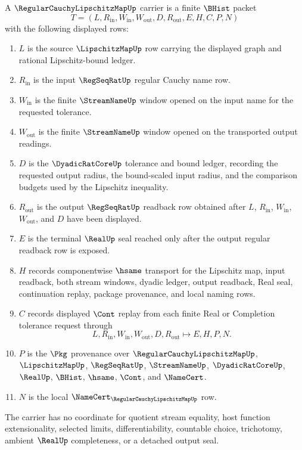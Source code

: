 \begin{definition}
\label{def:regular-cauchy-lipschitz-map-carrier}
A $\RegularCauchyLipschitzMapUp$ carrier is a finite $\BHist$ packet
$$
T=(L,R_{\mathrm{in}},W_{\mathrm{in}},W_{\mathrm{out}},D,R_{\mathrm{out}},E,H,C,P,N)
$$
with the following displayed rows:
\begin{enumerate}
\item $L$ is the source $\LipschitzMapUp$ row carrying the displayed graph and rational Lipschitz-bound ledger.
\item $R_{\mathrm{in}}$ is the input $\RegSeqRatUp$ regular Cauchy name row.
\item $W_{\mathrm{in}}$ is the finite $\StreamNameUp$ window opened on the input name for the requested tolerance.
\item $W_{\mathrm{out}}$ is the finite $\StreamNameUp$ window opened on the transported output readings.
\item $D$ is the $\DyadicRatCoreUp$ tolerance and bound ledger, recording the requested output radius, the bound-scaled input radius, and the comparison budgets used by the Lipschitz inequality.
\item $R_{\mathrm{out}}$ is the output $\RegSeqRatUp$ readback row obtained after $L$, $R_{\mathrm{in}}$, $W_{\mathrm{in}}$, $W_{\mathrm{out}}$, and $D$ have been displayed.
\item $E$ is the terminal $\RealUp$ seal reached only after the output regular readback row is exposed.
\item $H$ records componentwise $\hsame$ transport for the Lipschitz map, input readback, both stream windows, dyadic ledger, output readback, Real seal, continuation replay, package provenance, and local naming rows.
\item $C$ records displayed $\Cont$ replay from each finite Real or Completion tolerance request through
$$
L,R_{\mathrm{in}},W_{\mathrm{in}},W_{\mathrm{out}},D,R_{\mathrm{out}} \longmapsto E,H,P,N .
$$
\item $P$ is the $\Pkg$ provenance over $\RegularCauchyLipschitzMapUp$, $\LipschitzMapUp$, $\RegSeqRatUp$, $\StreamNameUp$, $\DyadicRatCoreUp$, $\RealUp$, $\BHist$, $\hsame$, $\Cont$, and $\NameCert$.
\item $N$ is the local $\NameCert_{\RegularCauchyLipschitzMapUp}$ row.
\end{enumerate}
The carrier has no coordinate for quotient stream equality, host function extensionality, selected limits, differentiability, countable choice, trichotomy, ambient $\RealUp$ completeness, or a detached output seal.
\end{definition}

